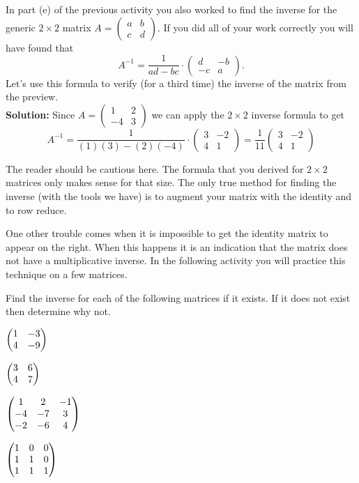 \begin{example}
In part (e) of the previous activity you also worked to find the inverse for the generic
$2 \times 2$ matrix $A = \begin{pmatrix} a & b \\ c & d \end{pmatrix}$.  If you did all of
your work correctly you will have found that 
\[ A^{-1} = \frac{1}{ad-bc} \cdot \begin{pmatrix} d & -b \\ -c & a \end{pmatrix}. \]
Let's use this formula to verify (for a third time) the inverse of the matrix from the
preview.
\\{\bf Solution:}
Since $A = \begin{pmatrix} 1 & 2 \\ -4 & 3 \end{pmatrix}$ we can apply the $2 \times 2$
inverse formula to get
\[ A^{-1} = \frac{1}{(1)(3) - (2)(-4)} \cdot \begin{pmatrix} 3 & -2 \\ 4 & 1 \end{pmatrix}
= \frac{1}{11} \begin{pmatrix} 3 & -2 \\ 4 & 1 \end{pmatrix} \]
\end{example}
The reader should be cautious here.  The formula that you derived for $2 \times 2$
matrices only makes sense for that size.  The only true method for finding the inverse
(with the tools we have) is to augment your matrix with the identity and to row reduce.

One other trouble comes when it is impossible to get the identity matrix to appear on the right.
When this happens it is an indication that the matrix does not have a multiplicative
inverse.  In the following activity you will practice this technique on a few matrices.
% 
% 
\begin{problem}
    Find the inverse for each of the following matrices if it exists.  If it does not
    exist then determine why not.
    \ba
        \item $\begin{pmatrix} 1 & -3 \\ 4 & -9 \end{pmatrix}$
        \item $\begin{pmatrix} 3 & 6 \\ 4 & 7 \end{pmatrix}$
        \item $\begin{pmatrix} 1 & 2 & -1 \\ -4 & -7 & 3 \\ -2 & -6 & 4 \end{pmatrix}$
        \item $\begin{pmatrix} 1 & 0 & 0 \\ 1 & 1 & 0 \\ 1 & 1 & 1 \end{pmatrix}$
    \ea

\end{problem}

